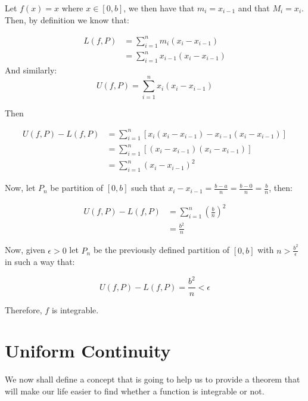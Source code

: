 \documentclass{report}
\begin{document}
    \begin{Example}
        Let $f(x) = x$ where $x \in [0,b]$, we then have that $m_i = x_{i-1}$ and that $M_i = x_i$. Then, by definition we know that:

        \begin{align*}
            L(f, P) &= \sum_{i=1}^{n} m_{i}(x_{i} - x_{i-1})\\
            &= \sum_{i=1}^{n}x_{i-1}(x_{i} - x_{i-1})
        \end{align*}
        And similarly:
        $$U(f, P) = \sum_{i=1}^{n}x_{i}(x_{i} - x_{i-1})$$

        Then

        \begin{align*}
            U(f, P)- L(f, P) &= \sum_{i=1}^{n} \left[x_i(x_i-x_{i-1}) - x_{i-1}(x_i-x_{i-1})\right]\\
            &= \sum_{i=1}^{n} \left[(x_i-x_{i-1})(x_i-x_{i-1})\right]\\
            &= \sum_{i=1}^{n} (x_i-x_{i-1})^2
        \end{align*}

        Now, let $P_n$ be partition of $[0,b]$ such that $x_i - x_{i-1} = \frac{b-a}{n} = \frac{b-0}{n} = \frac{b}{n}$, then:

        \begin{align*}
            U(f, P)- L(f, P) &= \sum_{i=1}^{n} \left(\frac{b}{n}\right)^2\\
            &= \frac{b^2}{n}
        \end{align*}

        Now, given $\epsilon > 0$ let $P_n$ be the previously defined partition of $[0,b]$ with $n > \frac{b^2}{\epsilon}$ in such a way that:

        $$U(f, P)- L(f, P) = \frac{b^2}{n} < \epsilon$$

        Therefore, $f$ is integrable.

    \end{Example}


    \section{Uniform Continuity}

    We now shall define a concept that is going to help us to provide a theorem that will make our life easier to find whether a function is integrable or not.
\end{document}
